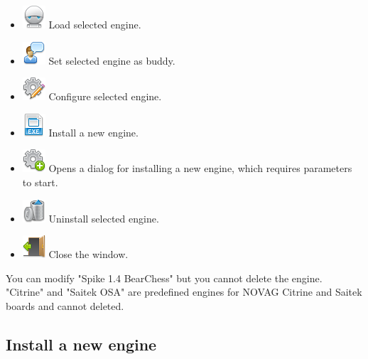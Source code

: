 \documentclass[11pt,a4paper]{article}
\begin{document}
	\begin{itemize}
		\item \includegraphics[scale=0.5]{robot.png} Load selected engine.
		\item \includegraphics[scale=0.5]{user_comment.png} Set selected engine as buddy.
		\item \includegraphics[scale=0.5]{cog_edit.png} Configure selected engine.
		\item \includegraphics[scale=0.5]{file_extension_exe.png} Install a new engine.
		\item \includegraphics[scale=0.5]{cog_add.png} Opens a dialog for installing a new engine, which requires parameters to start.
		\item \includegraphics[scale=0.5]{bin.png} Uninstall selected engine.
		\item \includegraphics[scale=0.5]{door_out.png} Close the window.
	\end{itemize}
	You can modify "Spike 1.4 BearChess" but you cannot delete the engine.\\
	"Citrine" and "Saitek OSA" are predefined engines for NOVAG Citrine and Saitek boards and cannot deleted.\\
	
	\subsection{Install a new engine} \label{InstallEngine}
	
\end{document}
